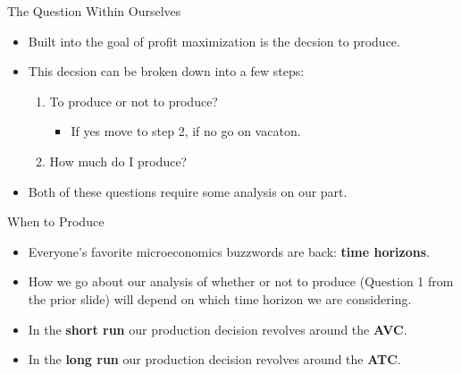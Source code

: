 \documentclass[aspectratio=169]{beamer}
\begin{document}
\begin{frame}{The Question Within Ourselves}
    \begin{itemize}
        \item Built into the goal of profit maximization is the decsion to produce.
        \vspace{2mm}
        \item This decsion can be broken down into a few steps:
        \vspace{2mm}
        \begin{enumerate}
            \vspace{2mm}
            \item<2-> To produce or not to produce?
            \begin{itemize}
                \item<3-> If yes move to step 2, if no go on vacaton.
            \end{itemize}
            \item<4-> How much do I produce?
        \end{enumerate}
        \vspace{2mm}
        \item<5-> Both of these questions require some analysis on our part.
    \end{itemize}
\end{frame}

\begin{frame}{When to Produce}
    \begin{itemize}
        \item Everyone's favorite microeconomics buzzwords are back: \textbf{time horizons}.
        \item How we go about our analysis of whether or not to produce (Question 1 from the prior slide) will depend on which time horizon we are considering.
        \item In the \textbf{short run} our production decision revolves around the \textbf{AVC}.
        \item In the \textbf{long run} our production decision revolves around the \textbf{ATC}.
    \end{itemize}
\end{frame}
\end{document}
